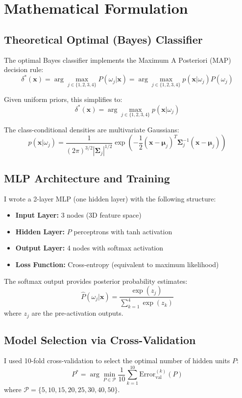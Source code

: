 \documentclass[12pt]{article}
\begin{document}
\section{Mathematical Formulation}  %

\subsection{Theoretical Optimal (Bayes) Classifier}
The optimal Bayes classifier implements the Maximum A Posteriori (MAP) decision rule:
\[
\delta^*(\mathbf{x}) = \arg\max_{j \in \{1,2,3,4\}} P(\omega_j|\mathbf{x})
= \arg\max_{j \in \{1,2,3,4\}} p(\mathbf{x}|\omega_j)P(\omega_j)
\]

Given uniform priors, this simplifies to:
\[
\delta^*(\mathbf{x}) = \arg\max_{j \in \{1,2,3,4\}} p(\mathbf{x}|\omega_j)
\]

The class-conditional densities are multivariate Gaussians:
\[
p(\mathbf{x}|\omega_j) = \frac{1}{(2\pi)^{3/2}|\boldsymbol{\Sigma}_j|^{1/2}} \exp\left(-\frac{1}{2}(\mathbf{x}-\boldsymbol{\mu}_j)^T\boldsymbol{\Sigma}_j^{-1}(\mathbf{x}-\boldsymbol{\mu}_j)\right)
\]

\subsection{MLP Architecture and Training}
I wrote a 2-layer MLP (one hidden layer) with the following structure:

\begin{itemize}
    \item \textbf{Input Layer:} 3 nodes (3D feature space)
    \item \textbf{Hidden Layer:} $P$ perceptrons with tanh activation  %
    \item \textbf{Output Layer:} 4 nodes with softmax activation
    \item \textbf{Loss Function:} Cross-entropy (equivalent to maximum likelihood)
\end{itemize}

The softmax output provides posterior probability estimates:
\[
\hat{P}(\omega_j|\mathbf{x}) = \frac{\exp(z_j)}{\sum_{k=1}^4 \exp(z_k)}
\]
where $z_j$ are the pre-activation outputs.

\subsection{Model Selection via Cross-Validation}
I used 10-fold cross-validation to select the optimal number of hidden units $P$:
\[
P^* = \arg\min_{P \in \mathcal{P}} \frac{1}{10}\sum_{k=1}^{10} \text{Error}_{\text{val}}^{(k)}(P)
\]
where $\mathcal{P} = \{5, 10, 15, 20, 25, 30, 40, 50\}$.
\end{document}
